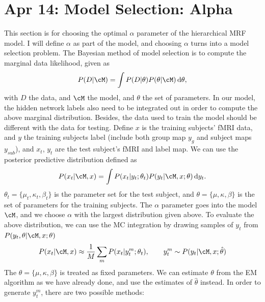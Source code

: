 \documentclass[12pt]{article}
\begin{document}
\section{Apr 14: Model Selection: Alpha}
This section is for choosing the optimal $\alpha$ parameter of the hierarchical
MRF model. I will define $\alpha$ as part of the model, and choosing $\alpha$
turns into a model selection problem. The Bayesian method of model selection is
to compute the marginal data likelihood, given as
\begin{align*}
  P(D | \cM) = \int P(D|\theta) P(\theta|\cM)\, \textrm{d}\theta,
\end{align*}
with $D$ the data, and $\cM$ the model, and $\theta$ the set of parameters. In
our model, the hidden network labels also need to be integrated out in order to
compute the above marginal distribution. Besides, the data used to train the
model should be different with the data for testing. Define $x$ is the training
subjects' fMRI data, and $y$ the training subjects label (include both group map
$y_g$ and subject maps $y_{sub}$), and $x_t$, $y_t$ are the test subject's fMRI
and label map. We can use the posterior predictive distribution defined as
\begin{align}
  P(x_t | \cM, x) = \int P(x_t | y_t; \theta_t) P(y_t| \cM, x; \theta)\, \textrm{d} y_t.
  \label{eq:predis}
\end{align}
$\theta_t = \{\mu_t, \kappa_t, \beta_t\}$ is the parameter set for the test
subject, and $\theta = \{\mu, \kappa, \beta\}$ is the set of parameters for the
training subjects. The $\alpha$ parameter goes into the model $\cM$, and we
choose $\alpha$ with the largest distribution given above. To evaluate the above
distribution, we can use the MC integration by drawing samples of $y_t$ from
$P(y_t, \theta|\cM, x; \theta)$
\begin{align*}
  P(x_t | \cM, x) \approx \frac{1}{M}\sum_m P(x_t|y_t^m; \theta_t), \qquad y_t^m \sim P(y_t|\cM, x; \hat \theta)
\end{align*}
 The $\theta = \{\mu, \kappa, \beta\}$ is treated as fixed parameters. We can
 estimate $\theta$ from the EM algorithm as we have already done, and use the
 estimates of $\hat \theta$ instead. In order to generate $y_t^m$, there are two possible methods:
\end{document}
